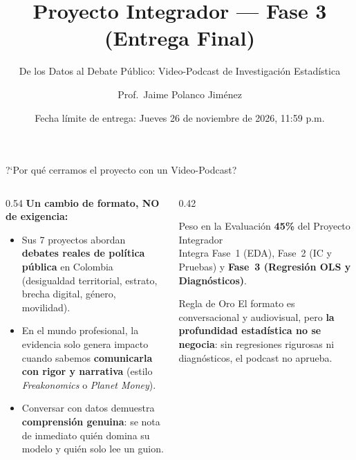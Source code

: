 \documentclass[aspectratio=169, 10pt]{beamer}
\title{Proyecto Integrador --- Fase 3 (Entrega Final)}
\subtitle{De los Datos al Debate P\'ublico: Video-Podcast de Investigaci\'on Estad\'istica}
\author{Prof.\ Jaime Polanco Jim\'enez}
\institute{Pontificia Universidad Javeriana\\
  Facultad de Ciencias Econ\'omicas y Administrativas --- Estad\'istica 2026-II}
\date{Fecha l\'imite de entrega: Jueves 26 de noviembre de 2026, 11:59 p.m.}
\begin{document}
\decimalpoint

\begin{frame}[plain]
  \titlepage
\end{frame}

\begin{frame}{?`Por qu\'e cerramos el proyecto con un Video-Podcast?}
  \begin{columns}[T]
    \begin{column}{0.54\textwidth}
      \textbf{Un cambio de formato, NO de exigencia:}
      \begin{itemize}\setlength{\itemsep}{6pt}
        \item Sus 7 proyectos abordan \textbf{debates reales de pol\'itica p\'ublica} en Colombia (desigualdad territorial, estrato, brecha digital, g\'enero, movilidad).
        \item En el mundo profesional, la evidencia solo genera impacto cuando sabemos \textbf{comunicarla con rigor y narrativa} (estilo \textit{Freakonomics} o \textit{Planet Money}).
        \item Conversar con datos demuestra \textbf{comprensi\'on genuina}: se nota de inmediato qui\'en domina su modelo y qui\'en solo lee un guion.
      \end{itemize}
    \end{column}
    \begin{column}{0.42\textwidth}
      \begin{block}{Peso en la Evaluaci\'on}
        \centering
        {\Large \textbf{45\%}} del Proyecto Integrador\\[4pt]
        \small Integra Fase~1 (EDA), Fase~2 (IC y Pruebas) y \textbf{Fase~3 (Regresi\'on OLS y Diagn\'osticos)}.
      \end{block}
      \vspace{6pt}
      \begin{alertblock}{Regla de Oro}
        \small El formato es conversacional y audiovisual, pero \textbf{la profundidad estad\'istica no se negocia}: sin regresiones rigurosas ni diagn\'osticos, el podcast no aprueba.
      \end{alertblock}
    \end{column}
  \end{columns}
\end{frame}
\end{document}
